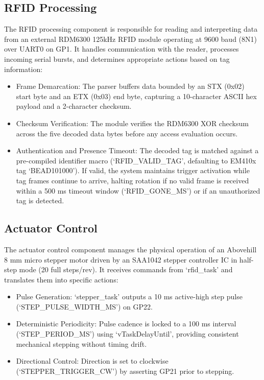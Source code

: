 \subsection{RFID Processing}
The RFID processing component is responsible for reading and interpreting data from an external RDM6300 125kHz RFID module operating at 9600 baud (8N1) over UART0 on GP1. It handles communication with the reader, processes incoming serial bursts, and determines appropriate actions based on tag information:
\begin{itemize}
    \item Frame Demarcation: The parser buffers data bounded by an STX (0x02) start byte and an ETX (0x03) end byte, capturing a 10-character ASCII hex payload and a 2-character checksum.
    \item Checksum Verification: The module verifies the RDM6300 XOR checksum across the five decoded data bytes before any access evaluation occurs.
    \item Authentication and Presence Timeout: The decoded tag is matched against a pre-compiled identifier macro (`RFID\_VALID\_TAG', defaulting to EM410x tag `BEAD101000'). If valid, the system maintains trigger activation while tag frames continue to arrive, halting rotation if no valid frame is received within a 500 ms timeout window (`RFID\_GONE\_MS') or if an unauthorized tag is detected.
\end{itemize}

\subsection{Actuator Control}
The actuator control component manages the physical operation of an Abovehill 8 mm micro stepper motor driven by an SAA1042 stepper controller IC in half-step mode (20 full steps/rev). It receives commands from `rfid\_task' and translates them into specific actions:
\begin{itemize}
    \item Pulse Generation: `stepper\_task' outputs a 10 ms active-high step pulse (`STEP\_PULSE\_WIDTH\_MS') on GP22.
    \item Deterministic Periodicity: Pulse cadence is locked to a 100 ms interval (`STEP\_PERIOD\_MS') using `vTaskDelayUntil', providing consistent mechanical stepping without timing drift.
    \item Directional Control: Direction is set to clockwise (`STEPPER\_TRIGGER\_CW') by asserting GP21 prior to stepping.
\end{itemize}

